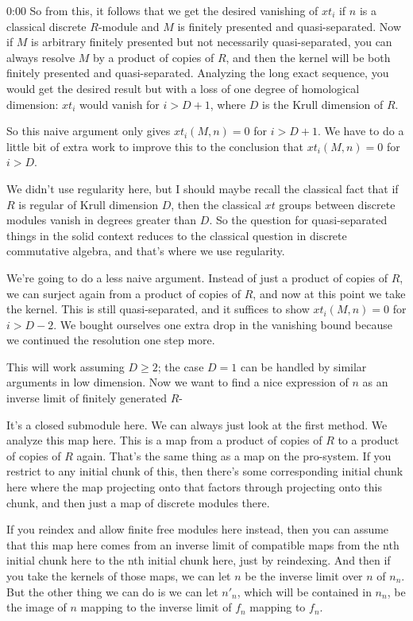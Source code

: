 \begin{unfinished}{0:00}
So from this, it follows that we get the desired vanishing of $\mathit{xt}_i$ if $n$ is a classical discrete $R$-module and $M$ is finitely presented and quasi-separated. Now if $M$ is arbitrary finitely presented but not necessarily quasi-separated, you can always resolve $M$ by a product of copies of $R$, and then the kernel will be both finitely presented and quasi-separated. Analyzing the long exact sequence, you would get the desired result but with a loss of one degree of homological dimension: $\mathit{xt}_i$ would vanish for $i > D+1$, where $D$ is the Krull dimension of $R$.

So this naive argument only gives $\mathit{xt}_i(M, n) = 0$ for $i > D+1$. We have to do a little bit of extra work to improve this to the conclusion that $\mathit{xt}_i(M, n) = 0$ for $i > D$.

We didn't use regularity here, but I should maybe recall the classical fact that if $R$ is regular of Krull dimension $D$, then the classical $\mathit{xt}$ groups between discrete modules vanish in degrees greater than $D$. So the question for quasi-separated things in the solid context reduces to the classical question in discrete commutative algebra, and that's where we use regularity.

We're going to do a less naive argument. Instead of just a product of copies of $R$, we can surject again from a product of copies of $R$, and now at this point we take the kernel. This is still quasi-separated, and it suffices to show $\mathit{xt}_i(M, n) = 0$ for $i > D-2$. We bought ourselves one extra drop in the vanishing bound because we continued the resolution one step more.

This will work assuming $D \geq 2$; the case $D = 1$ can be handled by similar arguments in low dimension. Now we want to find a nice expression of $n$ as an inverse limit of finitely generated $R$-

It's a closed submodule here. We can always just look at the first method. We analyze this map here. This is a map from a product of copies of $R$ to a product of copies of $R$ again. That's the same thing as a map on the pro-system. If you restrict to any initial chunk of this, then there's some corresponding initial chunk here where the map projecting onto that factors through projecting onto this chunk, and then just a map of discrete modules there. 

If you reindex and allow finite free modules here instead, then you can assume that this map here comes from an inverse limit of compatible maps from the nth initial chunk here to the nth initial chunk here, just by reindexing. And then if you take the kernels of those maps, we can let $n$ be the inverse limit over $n$ of $n_n$. But the other thing we can do is we can let $n'_n$, which will be contained in $n_n$, be the image of $n$ mapping to the inverse limit of $f_n$ mapping to $f_n$.


\end{unfinished}
